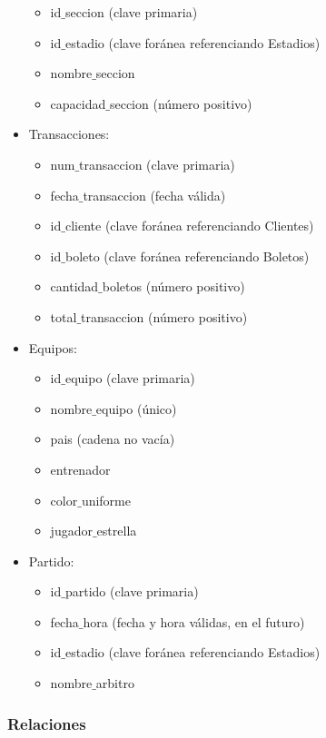 \begin{itemize}
\begin{itemize}
        \item id$\_$seccion (clave primaria)
        \item id$\_$estadio (clave foránea referenciando Estadios)
        \item nombre$\_$seccion
        \item capacidad$\_$seccion (número positivo)
    \end{itemize}    
    \item Transacciones:
    \begin{itemize}
        \item num$\_$transaccion (clave primaria)
        \item fecha$\_$transaccion (fecha válida)
        \item id$\_$cliente (clave foránea referenciando Clientes)
        \item id$\_$boleto (clave foránea referenciando Boletos)
        \item cantidad$\_$boletos (número positivo)
        \item total$\_$transaccion (número positivo)
    \end{itemize}
    \item Equipos:
    \begin{itemize}
        \item id$\_$equipo (clave primaria)
        \item nombre$\_$equipo (único)
        \item pais (cadena no vacía)
        \item entrenador
        \item color$\_$uniforme
        \item jugador$\_$estrella
    \end{itemize}
    \item Partido:
    \begin{itemize}
        \item id$\_$partido (clave primaria)
        \item fecha$\_$hora (fecha y hora válidas, en el futuro)
        \item id$\_$estadio (clave foránea referenciando Estadios)
        \item nombre$\_$arbitro
    \end{itemize}    
\end{itemize}


\subsubsection*{Relaciones}

